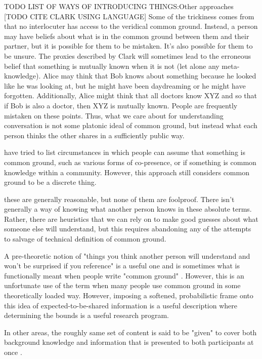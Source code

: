 \documentclass[]{article}
\begin{document}
TODO LIST OF WAYS OF INTRODUCING THINGS:Other approaches [TODO CITE CLARK USING LANGUAGE] Some of the trickiness comes from that no interlocuter has access to the veridical common ground. Instead, a person may have beliefs about what is in the common ground between them and their partner, but it is possible for them to be mistaken. It's also possible for them to be unsure. The proxies described by Clark will sometimes lead to the erroneous belief that something is mutually known when it is not (let alone any meta-knowledge). Alice may think that Bob knows about something because he looked like he was looking at, but he might have been daydreaming or he might have forgotten. Additionally, Alice might think that all doctors know XYZ and so that if Bob is also a doctor, then XYZ is mutually known. People are frequently mistaken on these points. Thus, what we care about for understanding conversation is not some platonic ideal of common ground, but instead what each person thinks the other shares in a sufficiently public way. 

have tried to list circumstances in which people can assume that something is common ground, such as various forms of co-presence, or if something is common knowledge within a community. However, this approach still considers common ground to be a discrete thing. 

 these are generally reasonable, but none of them are foolproof. There isn't generally a way of knowing what another person knows in these absolute terms. Rather, there are heuristics that we can rely on to make good guesses about what someone else will understand, but this requires abandoning any of the attempts to salvage of technical definition of common ground. 

A pre-theoretic notion of "things you think another person will understand and won't be surprised if you reference" is a useful one and is sometimes what is functionally meant when people write "common ground" \cite{leung2023}. However, this is an unfortunate use of the term when many people use common ground in some theoretically loaded way. However, imposing a softened, probabilistic frame onto this idea of expected-to-be-shared information is a useful description where determining the bounds is a useful research program. 

In other areas, the roughly same set of content is said to be "given" to cover both background knowledge and information that is presented to both participants at once \cite{fay2010}. 
\end{document}
